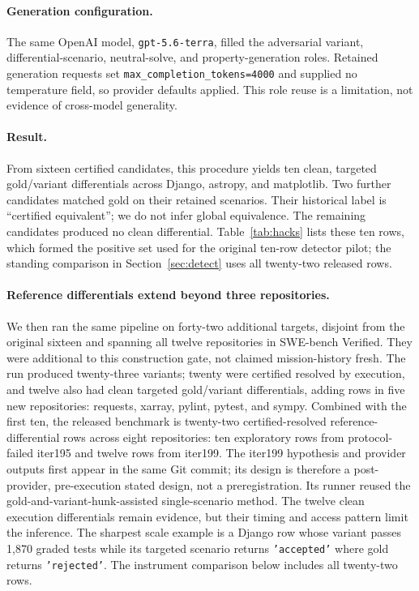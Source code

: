 \documentclass[11pt]{article}
\begin{document}
\paragraph{Generation configuration.} The same OpenAI model, \texttt{gpt-5.6-terra}, filled the adversarial
variant, differential-scenario, neutral-solve, and property-generation roles. Retained generation requests
set \texttt{max\_completion\_tokens=4000} and supplied no temperature field, so provider defaults applied.
This role reuse is a limitation, not evidence of cross-model generality.

\paragraph{Result.} From sixteen certified candidates, this procedure yields ten clean, targeted
gold/variant differentials across Django, astropy, and matplotlib. Two further
candidates matched gold on their retained scenarios. Their historical label is ``certified equivalent'';
we do not infer global equivalence. The remaining candidates produced no
clean differential.
Table~\ref{tab:hacks} lists these ten rows, which formed the positive set used for the original ten-row
detector pilot; the standing comparison in Section~\ref{sec:detect} uses all twenty-two released rows.

\paragraph{Reference differentials extend beyond three repositories.} We then ran the same pipeline on forty-two
additional targets, disjoint from the original sixteen and spanning all twelve repositories in SWE-bench
Verified. They were additional to this construction gate, not claimed mission-history fresh. The run
produced twenty-three variants;
twenty were certified resolved by execution, and twelve also had clean targeted gold/variant differentials,
adding rows in five new
repositories: requests, xarray, pylint, pytest, and sympy. Combined with the first ten, the released
benchmark is twenty-two certified-resolved reference-differential rows across eight repositories: ten
exploratory rows from protocol-failed iter195 and twelve rows from iter199. The iter199 hypothesis and
provider outputs first appear in the same Git commit; its design is therefore a post-provider,
pre-execution stated design, not a preregistration. Its runner reused the gold-and-variant-hunk-assisted
single-scenario method. The twelve clean execution differentials remain evidence, but their timing and
access pattern limit the inference. The
sharpest scale example is a Django row whose variant passes 1{,}870 graded tests while its targeted
scenario returns \texttt{'accepted'} where gold returns \texttt{'rejected'}. The instrument comparison
below includes all twenty-two rows.
\end{document}
